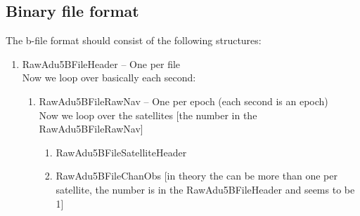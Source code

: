 \documentclass{article}
\begin{document}
\subsection{Binary file format}
The b-file format should consist of the following structures:
\begin{enumerate}
\item RawAdu5BFileHeader -- One per file \\
  Now we loop over basically each second:
  \begin{enumerate}
  \item RawAdu5BFileRawNav -- One per epoch (each second is an epoch) \\
    Now we loop over the satellites [the number in the RawAdu5BFileRawNav]    
    \begin{enumerate}
    \item RawAdu5BFileSatelliteHeader
    \item RawAdu5BFileChanObs [in theory the can be more than one per satellite, the number is in the RawAdu5BFileHeader and seems to be 1]
    \end{enumerate}
  \end{enumerate}
\end{enumerate}
  
  
\end{document}
